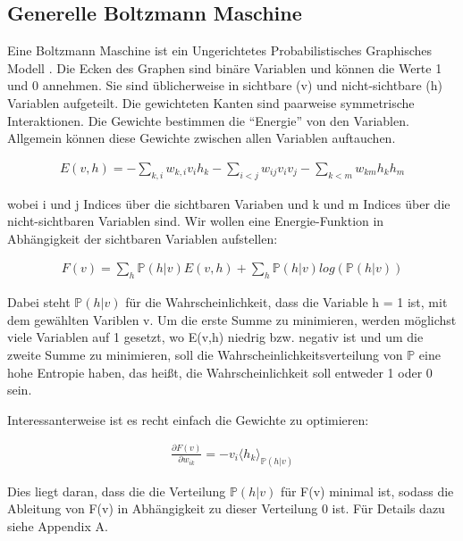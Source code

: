 \subsection{Generelle Boltzmann Maschine}
\label{subsec:bm}

Eine Boltzmann Maschine ist ein Ungerichtetes Probabilistisches Graphisches Modell \citep{DBLP:journals/jmlr/SallansH04}. Die Ecken des Graphen sind binäre Variablen und können die Werte 1 und 0 annehmen. Sie sind üblicherweise in sichtbare (v) und nicht-sichtbare (h) Variablen aufgeteilt. Die gewichteten Kanten sind paarweise symmetrische Interaktionen. Die Gewichte bestimmen die ``Energie'' von den Variablen. Allgemein können diese Gewichte zwischen allen Variablen auftauchen.

\begin{align}
	E(v,h) = - \sum_{k,i}w_{k,i}v_ih_k - \sum_{i < j}w_{ij}v_iv_j - \sum_{k<m}w_{km}h_kh_m \label{energie}
\end{align}

wobei i und j Indices über die sichtbaren Variaben und k und m Indices über die nicht-sichtbaren Variablen sind.
Wir wollen eine Energie-Funktion in Abhängigkeit der sichtbaren Variablen aufstellen:

\begin{align}
	F(v) = \sum_{h}\mathbb{P}(h|v)E(v,h) + \sum_{h}\mathbb{P}(h|v)log(\mathbb{P}(h|v)) \label{F}
\end{align}

Dabei steht $\mathbb{P}(h|v)$ für die Wahrscheinlichkeit, dass die Variable h = 1 ist, mit dem gewählten Variblen v.
Um die erste Summe zu minimieren, werden möglichst viele Variablen auf 1 gesetzt, wo E(v,h) niedrig bzw. negativ ist und um die zweite Summe zu minimieren, soll die Wahrscheinlichkeitsverteilung von $\mathbb{P}$ eine hohe Entropie haben, das heißt, die Wahrscheinlichkeit soll entweder 1 oder 0 sein.

Interessanterweise ist es recht einfach die Gewichte zu optimieren:

\begin{align}
	\frac{\partial F(v)}{\partial w_{ik}} = -v_i \langle h_k \rangle_{\mathbb{P}(h|v)} \label{update}
\end{align}

Dies liegt daran, dass die die Verteilung $\mathbb{P}(h|v)$ für F(v) minimal ist, sodass die Ableitung von F(v) in Abhängigkeit zu dieser Verteilung 0 ist. Für Details dazu siehe \citep{DBLP:journals/jmlr/SallansH04} Appendix A.

